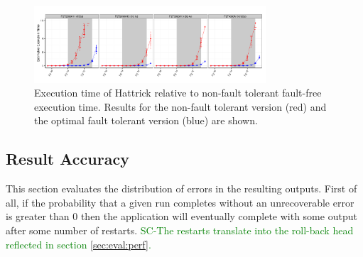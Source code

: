 \documentclass{sig-alternate}
\newcommand{\sui}[1]{%
  \textcolor{green}{SC-#1}
}
\begin{document}
\begin{figure}[ht!]
\centering
\includegraphics[width=3.4in]{figs/Hattrick_Par_Seq_EstdCost_log.png}
\vspace{-10pt}
\caption{Execution time of Hattrick relative to non-fault tolerant fault-free execution time. Results for the non-fault tolerant version (red) and the optimal fault tolerant version (blue) are shown.}
\vspace{-10pt}
\label{fig:Hattrick_EstdCost}
\end{figure}




\subsection{Result Accuracy}
\label{sec:eval:acc}


This section evaluates the distribution of errors in the resulting outputs.
First of all, if the probability that a given run completes without an unrecoverable error is greater than 0 then the application will eventually complete with some output after some number of restarts. \sui{The restarts translate into the roll-back head reflected in section \ref{sec:eval:perf}.}
\end{document}
